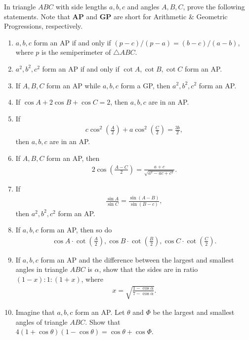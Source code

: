 \begin{tcolorbox}[title={Makshud's Exercises on Progressions in Triangles}]
\begin{question}[name=Law of Sines and Law of Cosines in Progressions]
    In triangle $ABC$ with side lengths $a,b,c$ and angles $A,B,C$, prove the following statements. Note that \textbf{AP} and \textbf{GP} are short for Arithmetic \& Geometric Progressions, respectively.
    \begin{enumerate}
        \item $a,b,c$ form an AP if and only if $(p-c)/(p-a) = (b-c)/(a-b)$, where $p$ is the semiperimeter of $\triangle ABC$.
        \item $a^2,b^2,c^2$ form an AP if and only if $\cot A, \cot B, \cot C$ form an AP.
        \item If $A,B,C$ form an AP while $a,b,c$ form a GP, then $a^2,b^2,c^2$ form an AP.
        \item If $\cos A + 2\cos B + \cos C = 2$, then $a,b,c$ are in an AP.
        \item If 
        \begin{align*}
            c\cos^2\left(\frac{A}{2}\right)+ a\cos^2\left(\frac{C}{2}\right) = \frac{3b}{2},
        \end{align*}
        then $a,b,c$ are in an AP.
        \item If $A,B,C$ form an AP, then
        \begin{align*}
            2\cos\left(\frac{A-C}{2}\right) = \frac{a+c}{\sqrt{a^2-ac+c^2}}.
        \end{align*}
        \item If
        \begin{align*}
            \frac{\sin A}{\sin C} = \frac{\sin(A-B)}{\sin(B-c)},
        \end{align*}
        then $a^2,b^2,c^2$ form an AP.
        \item If $a,b,c$ form an AP, then so do
        \begin{align*}
            \cos A \cdot \cot\left(\frac{A}{2}\right), \cos B \cdot \cot\left(\frac{B}{2}\right), \cos C \cdot \cot\left(\frac{C}{2}\right).
        \end{align*}
        \item If $a,b,c$ form an AP and the difference between the largest and smallest angles in triangle $ABC$ is $\alpha$, show that the sides are in ratio $(1-x):1:(1+x)$, where
        \begin{align*}
            x = \sqrt{\frac{1-\cos \alpha}{7-\cos \alpha}}.
        \end{align*}
        \item Imagine that $a,b,c$ form an AP. Let $\theta$ and $\Phi$ be the largest and smallest angles of triangle $ABC$. Show that $4(1+\cos \theta)(1-\cos \theta)=\cos \theta + \cos \Phi$.
    \end{enumerate}
\end{question}
\end{tcolorbox}


